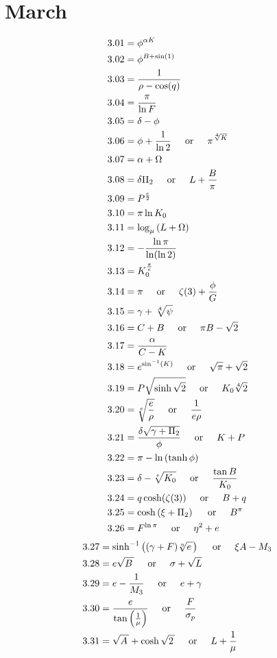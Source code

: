 \documentclass[12pt]{article}
\newcommand{\asinh}{\text{sinh}^{-1}}
\newcommand{\oder}{\hspace{5mm}\text{or}\hspace{5mm}}
\begin{document}
\pagebreak

\section{March}
\begin{align*}
3.01 &= \phi^{\alpha K}\\
3.02 &= \phi^{B + \sin(1)}\\
3.03 &= \frac{1}{\rho - \cos(q)}\\
3.04 &= \frac{\pi}{\ln F}\\
3.05 &= \delta - \phi\\
3.06 &= \phi + \frac{1}{\ln 2} \oder \pi^{\sqrt[4]{K}}\\
3.07 &= \alpha+\Omega\\
3.08 &= \delta \Pi_{2} \oder L+\frac{B}{\pi}\\
3.09 &= P^{\frac{e}{2}}\\
3.10 &= \pi \ln{K_{0}}\\
3.11 &= \log_{\mu}\left(L+\Omega\right)\\
3.12 &= -\frac{\ln \pi}{\ln(\ln 2)}\\
3.13 &= K_{0}^{\frac{\pi}{e}}\\
3.14 &= \pi \oder \zeta(3)+\frac{\phi}{G}\\
3.15 &= \gamma+\sqrt[A]{\psi}\\
3.16 &= C + B \oder \pi B-\sqrt{2}\\
3.17 &= \frac{\alpha}{C - K}\\
3.18 &= e^{\sin^{-1}(K)} \oder \sqrt{\pi} + \sqrt{2}\\
3.19 &= P \sqrt{\sinh\sqrt{2}} \oder K_{0} \sqrt[4]{2}\\
3.20 &= \sqrt[e]{\frac{e}{\rho}} \oder \frac{1}{e \rho}\\
3.21 &= \frac{\delta\sqrt{\gamma+\Pi_{2}}}{\phi} \oder K+P\\
3.22 &= \pi-\ln\left(\tanh\phi\right)\\
3.23 &= \delta-\sqrt[e]{K_{0}} \oder \frac{\tan B}{K_{0}}\\
3.24 &= q\cosh(\zeta(3)) \oder B+q\\
3.25 &= \cosh\left(\xi+\Pi_{2}\right) \oder B^{\pi}\\
3.26 &= F^{\ln\pi} \oder \eta^{2} + e\\
\end{align*}
\begin{align*}
3.27 &= \asinh\left((\gamma + F)\sqrt[\eta]{e\,}\right) \oder \xi A-M_{3}\\
3.28 &= e\sqrt{B\,} \oder \sigma+\sqrt{L}\\
3.29 &= e-\frac{1}{M_{3}} \oder e+\gamma\\
3.30 &= \frac{e}{\tan\left(\frac{1}{\mu}\right)} \oder \frac{F}{\sigma_{p}}\\
3.31 &= \sqrt{A\,}+\cosh\sqrt{2\,} \oder L+\frac{1}{\mu}\\
\end{align*}
\end{document}
